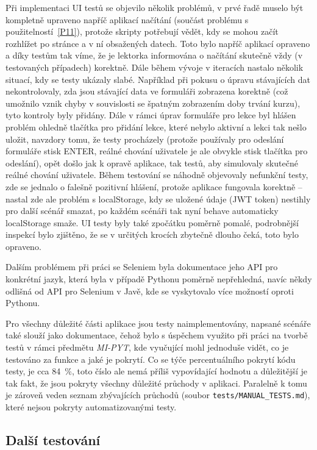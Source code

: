 Při implementaci UI testů se objevilo několik problémů, v prvé řadě muselo být kompletně upraveno napříč aplikací načítání (součást problému s použitelností~\ref{P11}), protože skripty potřebují vědět, kdy se mohou začít rozhlížet po stránce a v ní obsažených datech. Toto bylo napříč aplikací opraveno a díky testům tak víme, že je lektorka informována o načítání skutečně vždy (v testovaných případech) korektně. Dále během vývoje v iteracích nastalo několik situací, kdy se testy ukázaly slabé. Například při pokusu o úpravu stávajících dat nekontrolovaly, zda jsou stávající data ve formuláři zobrazena korektně (což umožnilo vznik chyby v souvislosti se špatným zobrazením doby trvání kurzu), tyto kontroly byly přidány. Dále v rámci úprav formuláře pro lekce byl hlášen problém ohledně tlačítka pro přidání lekce, které nebylo aktivní a lekci tak nešlo uložit, navzdory tomu, že testy procházely (protože používaly pro odeslání formuláře stisk ENTER, reálné chování uživatele je ale obvykle stisk tlačítka pro odeslání), opět došlo jak k opravě aplikace, tak testů, aby simulovaly skutečné reálné chování uživatele. Během testování se náhodně objevovaly nefunkční testy, zde se jednalo o falešně pozitivní hlášení, protože aplikace fungovala korektně -- nastal zde ale problém s localStorage, kdy se uložené údaje (JWT token) nestihly pro další scénář smazat, po každém scénáři tak nyní behave automaticky localStorage smaže. UI testy byly také zpočátku poměrně pomalé, podrobnější inspekcí bylo zjištěno, že se v určitých krocích zbytečně dlouho čeká, toto bylo opraveno.

Dalším problémem při práci se Seleniem byla dokumentace jeho API pro konkrétní jazyk, která byla v případě Pythonu poměrně nepřehledná, navíc někdy odlišná od API pro Selenium v Javě, kde se vyskytovalo více možností oproti Pythonu.

Pro všechny důležité části aplikace jsou testy naimplementovány, napsané scénáře také slouží jako dokumentace, čehož bylo s úspěchem využito při práci na tvorbě testů v rámci předmětu \textit{MI-PYT}, kde vyučující mohl jednoduše vidět, co je testováno za funkce a jaké je pokrytí. Co se týče percentuálního pokrytí kódu testy, je cca 84~\%, toto číslo ale nemá příliš vypovídající hodnotu a důležitější je tak fakt, že jsou pokryty všechny důležité průchody v aplikaci. Paralelně k tomu je zároveň veden seznam zbývajících průchodů (soubor \verb|tests/MANUAL_TESTS.md|), které nejsou pokryty automatizovanými testy.

\subsection{Další testování}

